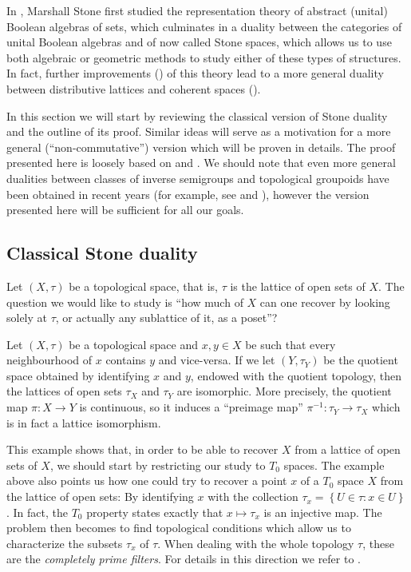 %
%
%
%
In \cite{MR1501865}, Marshall Stone first studied the representation theory of abstract (unital) Boolean algebras of sets, which culminates in a duality between the categories of unital Boolean algebras and of now called Stone spaces, which allows us to use both algebraic or geometric methods to study either of these types of structures. In fact, further improvements (\cite{dml124080}) of this theory lead to a more general duality between distributive lattices and coherent spaces (\cite[II.3.4]{MR861951}).

In this section we will start by reviewing the classical version of Stone duality and the outline of its proof. Similar ideas will serve as a motivation for a more general (``non-commutative'') version which will be proven in details. The proof presented here is loosely based on \cite{MR2827424} and \cite{MR3077869}. We should note that even more general dualities between classes of inverse semigroups and topological groupoids have been obtained in recent years (for example, see \cite{arxiv1803.00394v2} and  \cite{MR3077869}), however the version presented here will be sufficient for all our goals.

\subsection{Classical Stone duality}

Let $(X,\tau)$ be a topological space, that is, $\tau$ is the lattice of open sets of $X$. The question we would like to study is ``how much of $X$ can one recover by looking solely at $\tau$, or actually any sublattice of it, as a poset''?

\begin{example}
Let $(X,\tau)$ be a topological space and $x,y\in X$ be such that every neighbourhood of $x$ contains $y$ and vice-versa. If we let $(Y,\tau_Y)$ be the quotient space obtained by identifying $x$ and $y$, endowed with the quotient topology, then the lattices of open sets $\tau_X$ and $\tau_Y$ are isomorphic. More precisely, the quotient map $\pi:X\to Y$ is continuous, so it induces a ``preimage map'' $\pi^{-1}:\tau_Y\to\tau_X$ which is in fact a lattice isomorphism.%
\end{example}

This example shows that, in order to be able to recover $X$ from a lattice of open sets of $X$, we should start by restricting our study to $T_0$ spaces. The example above also points us how one could try to recover a point $x$ of a $T_0$ space $X$ from the lattice of open sets: By identifying $x$ with the collection $\tau_x=\left\{U\in\tau:x\in U\right\}$. In fact, the $T_0$ property states exactly that $x\mapsto \tau_x$ is an injective map. The problem then becomes to find topological conditions which allow us to characterize the subsets $\tau_x$ of $\tau$. When dealing with the whole topology $\tau$, these are the \emph{completely prime filters}. For details in this direction we refer to \cite[II.3.3 and 3.4]{MR861951}.%

